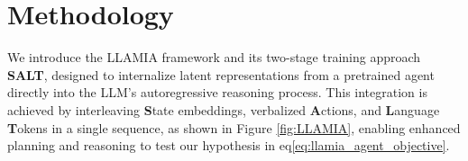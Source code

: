 \documentclass{article}
\newcommand{\yaman}[1]{\textcolor{yamanColor}{\scriptsize \textit{#1}}}
\newcommand{\yaman}[1]{{\scriptsize\textcolor{red}{[Yaman: #1]}}}
\theoremstyle{plain}
\theoremstyle{definition}
\theoremstyle{remark}
\begin{document}











\section{Methodology}
\label{sec:methodology}
\vspace{-2mm}
We introduce the LLAMIA framework and its two-stage training approach \textbf{SALT}, designed to internalize latent representations from a pretrained agent directly into the LLM’s autoregressive reasoning process. This integration is achieved by interleaving \textbf{S}tate embeddings, verbalized \textbf{A}ctions, and \textbf{L}anguage \textbf{T}okens in a single sequence, as shown in Figure \ref{fig:LLAMIA}, enabling enhanced planning and reasoning to test our hypothesis in eq\ref{eq:llamia_agent_objective}.
\end{document}
